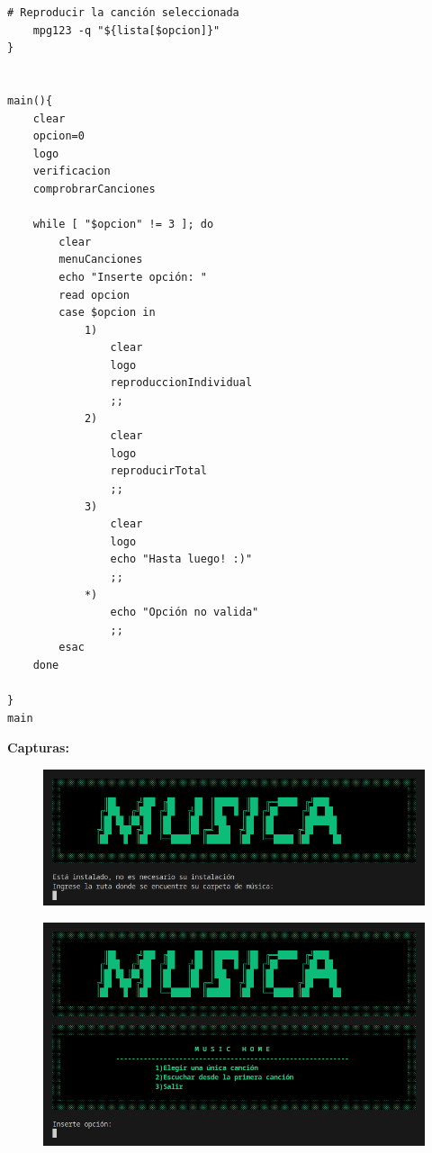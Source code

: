 \documentclass[letter,12pt]{article} %
\begin{document}
\begin{lstlisting}[style=BashInputStyle]
    # Reproducir la canción seleccionada
    mpg123 -q "${lista[$opcion]}"
}


main(){
    clear
    opcion=0
    logo
    verificacion
    comprobrarCanciones
    
    while [ "$opcion" != 3 ]; do
        clear
        menuCanciones
        echo "Inserte opción: "
        read opcion
        case $opcion in
            1)                
                clear
                logo
                reproduccionIndividual
                ;;
            2)                
                clear
                logo
                reproducirTotal
                ;;
            3)    
                clear
                logo
                echo "Hasta luego! :)"    
                ;;
            *)    
                echo "Opción no valida"
                ;;
        esac
    done
    
}
main
\end{lstlisting}
\textbf{Capturas:} \par
\begin{figure}[H]
	\centering
	\includegraphics[scale=0.6]{imagenes/musica1.png}
\end{figure}
\begin{figure}[H]
	\centering
        \includegraphics[scale=0.6]{imagenes/musica2.png}
\end{figure}
\end{document}
